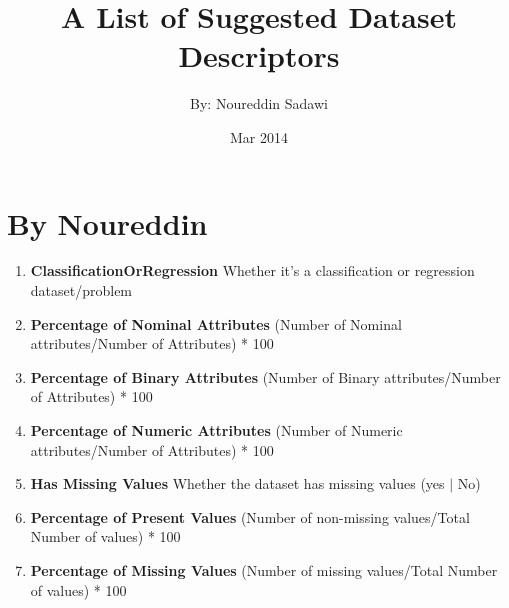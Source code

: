 \documentclass[a4paper,12pt, english]{article}
\begin{document}
\title{A List of Suggested Dataset Descriptors}
\date{Mar 2014}
\author{By: Noureddin Sadawi}
\maketitle

\large
\section{By Noureddin}
\begin{enumerate}
	\item \textbf{ClassificationOrRegression}  Whether it's a classification or regression dataset/problem
	\item \textbf{Percentage of Nominal Attributes} (Number of Nominal attributes/Number of Attributes) * 100
	\item \textbf{Percentage of Binary Attributes} (Number of Binary attributes/Number of Attributes) * 100
	\item \textbf{Percentage of Numeric Attributes} (Number of Numeric attributes/Number of Attributes) * 100      

	\item \textbf{Has Missing Values} Whether the dataset has missing values (yes $|$ No)
	\item \textbf{Percentage of Present Values} (Number of non-missing values/Total Number of values) * 100 
	\item \textbf{Percentage of Missing Values} (Number of missing values/Total Number of values) * 100 
\end{enumerate}    
\end{document}
